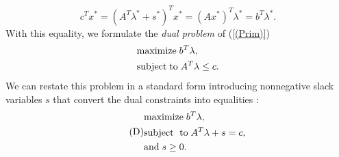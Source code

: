 \documentclass[a4paper,10 pt,titlepage,twoside]{book}
\theoremstyle{plain}
\theoremstyle{definition}
\theoremstyle{remark}
\begin{document}
\begin{equation}\label{Dual}\tag{2.7}
	c^{T}x^{*}=\left(A^{T}\lambda^{*}+s^{*}\right)^{T}x^{*}=\left(Ax^{*}\right)^{T}\lambda^{*}=b^{T}\lambda^{*}.
\end{equation}
With this equality, we formulate the \textit{dual problem} of (\ref{(Prim)})
\begin{equation*}
\begin{split}
&\text{maximize\;} b^{T}\lambda,\\
&\text{subject\;to\;}A^{T}\lambda \leq c.
\end{split}
\end{equation*} 
We can restate this problem in a standard form introducing nonnegative slack variables $s$ that convert the dual constraints into equalities :
\begin{equation}\tag{D}\label{(Dual)}
\begin{split}
&\text{maximize\;}b^{T}\lambda,\\
&\text{subject\; to\;}A^{T}\lambda+s=c,\\ &\text{and\;} s\geq0.
\end{split}
\end{equation}
\end{document}
